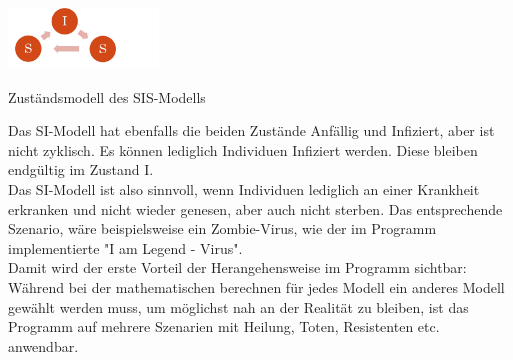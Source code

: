 \includegraphics[width= 0.3\textwidth]{./images/SIS-Modell.jpg}\caption{Zuständsmodell des SIS-Modells}
Das SI-Modell hat ebenfalls die beiden Zustände Anfällig und Infiziert, aber ist nicht zyklisch. Es können lediglich Individuen Infiziert werden. Diese bleiben endgültig im Zustand I.\\ 
Das SI-Modell ist also sinnvoll, wenn Individuen lediglich an einer Krankheit erkranken und nicht wieder genesen, aber auch nicht sterben. Das entsprechende Szenario, wäre beispielsweise ein Zombie-Virus, wie der im Programm implementierte "I am Legend - Virus".\\
Damit wird der erste Vorteil der Herangehensweise im Programm sichtbar: Während bei der mathematischen berechnen für jedes Modell ein anderes Modell gewählt werden muss, um möglichst nah an der Realität zu bleiben, ist das Programm auf mehrere Szenarien mit Heilung, Toten, Resistenten etc. anwendbar.